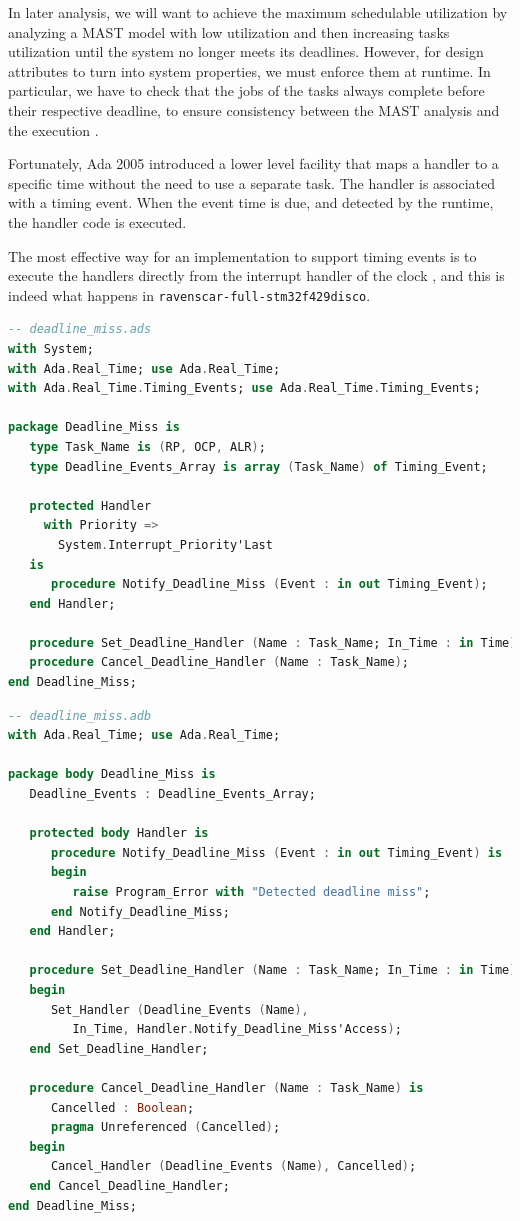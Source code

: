 \documentclass{article}
\begin{document}
In later analysis, we will want to achieve the maximum schedulable utilization by analyzing a MAST model with low utilization and then increasing tasks utilization until the system no longer meets its deadlines. However, for design attributes to turn into system properties, we must enforce them at runtime. In particular, we have to check that the jobs of the tasks always complete before their respective deadline, to ensure consistency between the MAST analysis and the execution \cite{timing-properties}.

Fortunately, Ada 2005 introduced a lower level facility that maps a handler to a specific time without the need to use a separate task. The handler is associated with a timing event. When the event time is due, and detected by the runtime, the handler code is executed.

The most effective way for an implementation to support timing events is to execute the handlers directly from the interrupt handler of the clock \cite{timing-events}, and this is indeed what happens in \texttt{ravenscar-full-stm32f429disco}.

\begin{lstlisting}[language=Ada]
-- deadline_miss.ads
with System;
with Ada.Real_Time; use Ada.Real_Time;
with Ada.Real_Time.Timing_Events; use Ada.Real_Time.Timing_Events;

package Deadline_Miss is
   type Task_Name is (RP, OCP, ALR);
   type Deadline_Events_Array is array (Task_Name) of Timing_Event;

   protected Handler
     with Priority =>
       System.Interrupt_Priority'Last
   is
      procedure Notify_Deadline_Miss (Event : in out Timing_Event);
   end Handler;

   procedure Set_Deadline_Handler (Name : Task_Name; In_Time : in Time);
   procedure Cancel_Deadline_Handler (Name : Task_Name);
end Deadline_Miss;
\end{lstlisting}

\begin{lstlisting}[language=Ada]
-- deadline_miss.adb
with Ada.Real_Time; use Ada.Real_Time;

package body Deadline_Miss is
   Deadline_Events : Deadline_Events_Array;

   protected body Handler is
      procedure Notify_Deadline_Miss (Event : in out Timing_Event) is
      begin
         raise Program_Error with "Detected deadline miss";
      end Notify_Deadline_Miss;
   end Handler;

   procedure Set_Deadline_Handler (Name : Task_Name; In_Time : in Time) is
   begin
      Set_Handler (Deadline_Events (Name),
         In_Time, Handler.Notify_Deadline_Miss'Access);
   end Set_Deadline_Handler;

   procedure Cancel_Deadline_Handler (Name : Task_Name) is
      Cancelled : Boolean;
      pragma Unreferenced (Cancelled);
   begin
      Cancel_Handler (Deadline_Events (Name), Cancelled);
   end Cancel_Deadline_Handler;
end Deadline_Miss;
\end{lstlisting}
\end{document}
